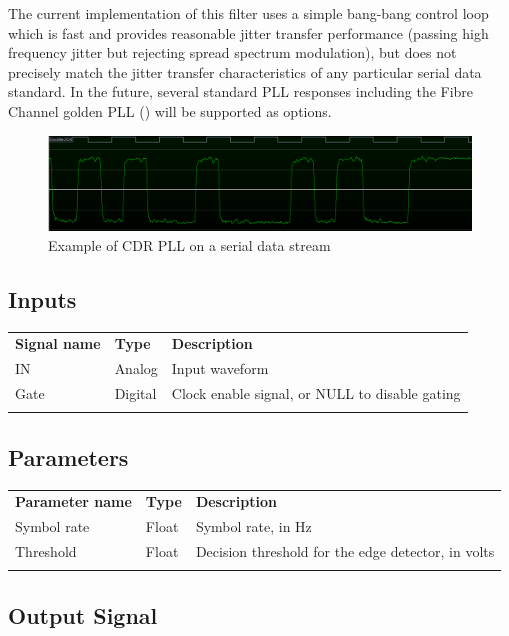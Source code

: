 The current implementation of this filter uses a simple bang-bang control loop which is fast and provides reasonable
jitter transfer performance (passing high frequency jitter but rejecting spread spectrum modulation), but does not
precisely match the jitter transfer characteristics of any particular serial data standard. In the future, several
standard PLL responses including the Fibre Channel golden PLL () will be supported as options.

\begin{figure}[h]
\centering
\includegraphics[width=16cm]{images/filters/cdrpll.png}
\caption{Example of CDR PLL on a serial data stream}
\label{filter_cdrpll}
\end{figure}

\subsection{Inputs}

\begin{tabularx}{16cm}{llX}
\thickhline
\textbf{Signal name} & \textbf{Type} & \textbf{Description} \\
\thickhline
IN & Analog & Input waveform \\
\thinhline
Gate & Digital & Clock enable signal, or NULL to disable gating\\
\thickhline
\end{tabularx}

\subsection{Parameters}

\begin{tabularx}{16cm}{llX}
\thickhline
\textbf{Parameter name} & \textbf{Type} & \textbf{Description} \\
\thickhline
Symbol rate & Float & Symbol rate, in Hz\\
\thinhline
Threshold & Float & Decision threshold for the edge detector, in volts\\
\thickhline
\end{tabularx}

\subsection{Output Signal}

